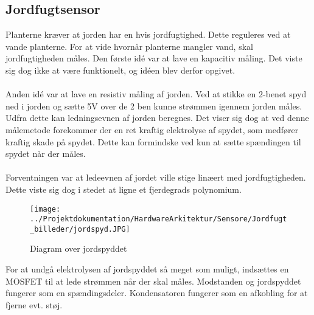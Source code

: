 \subsection{Jordfugtsensor}
Planterne kræver at jorden har en hvis jordfugtighed. Dette reguleres ved at vande planterne. For at vide hvornår planterne mangler vand, skal jordfugtigheden måles. Den første idé var at lave en kapacitiv måling. Det viste sig dog ikke at være funktionelt, og idéen blev derfor opgivet.
\\\\
Anden idé var at lave en resistiv måling af jorden. Ved at stikke en 2-benet spyd ned i jorden og sætte 5V over de 2 ben kunne strømmen igennem jorden måles. Udfra dette kan ledningsevnen af jorden beregnes. Det viser sig dog at ved denne målemetode forekommer der en ret kraftig elektrolyse af spydet, som medfører kraftig skade på spydet. Dette kan formindske ved kun at sætte spændingen til spydet når der måles.
\\\\
Forventningen var at ledeevnen af jordet ville stige linæert med jordfugtigheden. Dette viste sig dog i stedet at ligne et fjerdegrads polynomium.

\begin{figure}[H]
	\centering 
	\texttt{[image: ../Projektdokumentation/HardwareArkitektur/Sensore/Jordfugt\_billeder/jordspyd.JPG]}
	\caption{Diagram over jordspyddet}
	\label{photo:jordspyd_diagram}
\end{figure} 

For at undgå elektrolysen af jordspyddet så meget som muligt, indsættes en MOSFET til at lede strømmen når der skal måles. Modstanden og jordspyddet fungerer som en spændingsdeler. Kondensatoren fungerer som en afkobling for at fjerne evt. støj.

